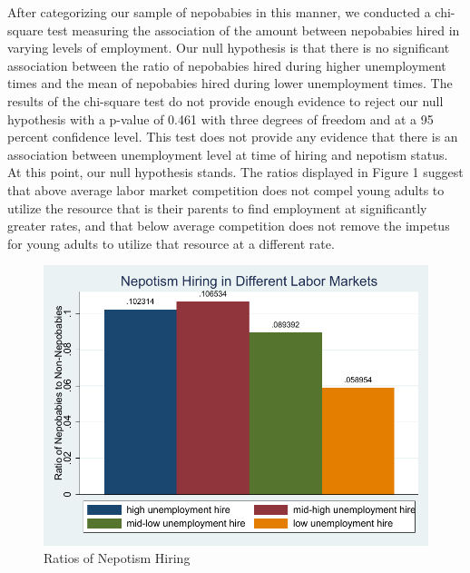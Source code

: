 \documentclass[12pt]{article}
\begin{document}
After categorizing our sample of nepobabies in this manner, we conducted a chi-square test measuring the association of the amount between nepobabies hired in varying levels of employment. Our null hypothesis is that there is no significant association between the ratio of nepobabies hired during higher unemployment times and the mean of nepobabies hired during lower unemployment times. The results of the chi-square test do not provide enough evidence to reject our null hypothesis with a p-value of 0.461 with three degrees of freedom and at a 95 percent confidence level. This test does not provide any evidence that there is an association between unemployment level at time of hiring and nepotism status. At this point, our null hypothesis stands. The ratios displayed in Figure 1 suggest that above average labor market competition does not compel young adults to utilize the resource that is their parents to find employment at significantly greater rates, and that below average competition does not remove the impetus for young adults to utilize that resource at a different rate.

\begin{figure}
    \centering
    \includegraphics[width=0.65\linewidth]{NepoHireRatioBarGraph.pdf}
    \caption{Ratios of Nepotism Hiring}
    \label{fig:enter-label}
\end{figure}
\end{document}

